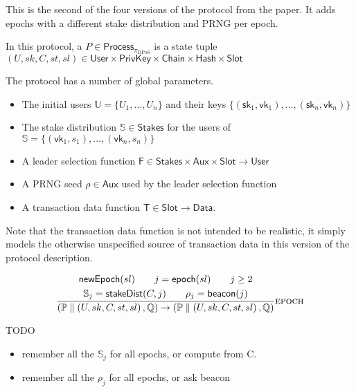 \documentclass[12pt]{article}
\newcommand{\sPar}{\mathrel{\parallel}}
\newcommand{\sSystem}[2]{\left( #1, #2 \right)}
\newcommand{\sProcess}[3]{\left( U, sk, #1, #2, #3 \right)}
\newcommand{\sChain}{C}
\newcommand{\sState}{st}
\newcommand{\sSlot}{sl}
\newcommand{\sLeader}{\mathsf{F}}
\newcommand{\sQueue}{\mathbb{Q}}
\newcommand{\sProcesses}{\mathbb{P}}
\begin{document}
This is the second of the four versions of the protocol from the paper. It adds
epochs with a different stake distribution and PRNG per epoch.

In this protocol, a $P \in \mathsf{Process}_{\pi_{\text{DPoS}}}$ is
a state tuple $\sProcess{\sChain}{\sState}{\sSlot} \in 
\mathsf{User} \times \mathsf{PrivKey} \times \mathsf{Chain} \times \mathsf{Hash} \times \mathsf{Slot}$

The protocol has a number of global parameters.
\begin{itemize}
\item The initial users $\mathbb{U} = \{U_1, \ldots, U_n\}$ and their keys $\{(\mathsf{sk}_1, \mathsf{vk}_1), \ldots, (\mathsf{sk}_n, \mathsf{vk}_n)\}$
\item The stake distribution $\mathbb{S} \in \mathsf{Stakes}$ for the users of $\mathbb{S} = \{ (\mathsf{vk}_1, s_1), \ldots, (\mathsf{vk}_n, s_n) \}$
\item A leader selection function $\sLeader \in \mathsf{Stakes} \times \mathsf{Aux} \times \mathsf{Slot} \rightarrow \mathsf{User}$
\item A PRNG seed $\rho \in \mathsf{Aux}$ used by the leader selection function
\item A transaction data function $\mathsf{T} \in \mathsf{Slot} \rightarrow \mathsf{Data}$.
\end{itemize}

Note that the transaction data function is not intended to be realistic,
it simply models the otherwise unspecified source of transaction data in
this version of the protocol description.


\begin{equation*}
\frac{
  \begin{array}{c}
    \mathsf{newEpoch}(\sSlot)
    \qquad
    j = \mathsf{epoch}(\sSlot)
    \qquad
    j \geq 2
    \\[1mm]
    \mathbb{S}_j = \mathsf{stakeDist}(\sChain, j)
    \qquad
    \rho_j = \mathsf{beacon}(j)
  \end{array}
}{
  \sSystem{\sProcesses \sPar \sProcess{\sChain}{\sState}{\sSlot}}{\sQueue}
\rightarrow
  \sSystem{\sProcesses \sPar \sProcess{\sChain}{\sState}{\sSlot}}{\sQueue}
} \textsc{epoch}
\end{equation*}

TODO
\begin{itemize}
\item remember all the $\mathbb{S}_j$ for all epochs, or compute from C.
\item remember all the $\rho_j$ for all epochs, or ask beacon
\end{itemize}



\end{document}

